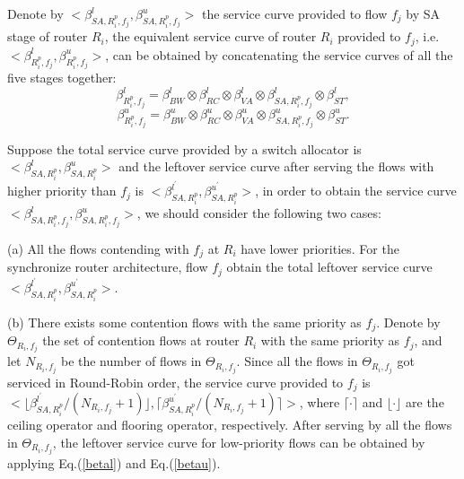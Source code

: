 \documentclass[10pt,journal]{IEEEtran}
\begin{document}
Denote by $<\beta_{SA,R_i^{p},f_j}^l,\beta_{SA,R_i^{p},f_j}^u>$ the service curve provided to flow $f_j$ by SA stage of router $R_i$, the equivalent service curve of router $R_i$ provided to $f_j$, i.e. $<\beta_{R_i^{p},f_j}^l,\beta_{R_i^{p},f_j}^u>$, can be obtained by concatenating the service curves of all the five stages together:
$$\beta_{R_i^{p},f_j}^l=\beta_{BW}^l\otimes\beta_{RC}^l\otimes\beta_{VA}^l\otimes\beta_{SA,R_i^{p},f_j}^l\otimes \beta_{ST}^l,$$
$$\beta_{R_i^{p},f_j}^u=\beta_{BW}^u\otimes\beta_{RC}^u\otimes\beta_{VA}^u\otimes\beta_{SA,R_i^{p},f_j}^u\otimes \beta_{ST}^u.$$

Suppose the total service curve provided by a switch allocator is $<\beta_{SA,R_i^{p}}^l,\beta_{SA,R_i^{p}}^u>$ and the leftover service curve after serving the flows with higher priority than $f_j$ is $<\beta_{SA,R_i^{p}}^{l^\prime},\beta_{SA,R_i^{p}}^{u^\prime}>$, in order to obtain the service curve $<\beta_{SA,R_i^{p},f_j}^l,\beta_{SA,R_i^{p},f_j}^u>$, we should consider the following two cases:

(a) All the flows contending with $f_j$ at $R_i$ have lower priorities. For the synchronize router architecture, flow $f_j$ obtain the total leftover service curve $<\beta_{SA,R_i^{p}}^{l^\prime},\beta_{SA,R_i^{p}}^{u^\prime}>$.

(b) There exists some contention flows with the same priority as $f_j$. Denote by $\Theta_{R_i,f_j}$ the set of contention flows at router $R_i$ with the same priority as $f_j$, and let $N_{R_i,f_j}$ be the number of flows in $\Theta_{R_i,f_j}$. Since all the flows in $\Theta_{R_i,f_j}$ got serviced in Round-Robin order, the service curve provided to $f_j$ is $<\lfloor\beta^{l^\prime}_{SA,R_i^{p}}/(N_{R_i,f_j}+1)\rfloor,\lceil\beta^{u^\prime}_{SA,R_i^{p}}/(N_{R_i,f_j}+1)\rceil>$, where $\lceil\cdot\rceil$ and $\lfloor\cdot\rfloor$ are the ceiling operator and flooring operator, respectively. After serving by all the flows in $\Theta_{R_i,f_j}$, the leftover service curve for low-priority flows can be obtained by applying Eq.(\ref{betal}) and Eq.(\ref{betau}).
\end{document}
